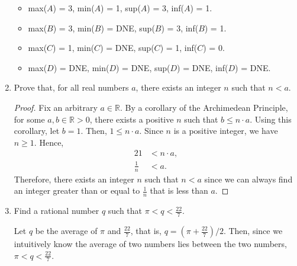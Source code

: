\documentclass{article}
\begin{document}
\begin{enumerate}
                \begin{itemize}
                    \item max($A$) = 3, min($A$) = 1, sup($A$) = 3, inf($A$) = 1.
                    \item max($B$) = 3, min($B$) = DNE, sup($B$) = 3, inf($B$) = 1.
                    \item max($C$) = 1, min($C$) = DNE, sup($C$) = 1, inf($C$) = 0.
                    \item max($D$) = DNE, min($D$) = DNE, sup($D$) = DNE, inf($D$) = DNE. 
                \end{itemize}

    	\item Prove that, for all real numbers $a$, there exists an integer $n$ such that $n < a$. \par
                \begin{proof}
                    Fix an arbitrary $a \in \mathbb{R}$. By a corollary of the Archimedean Principle, for some $a, b \in \mathbb{R} > 0$, there exists a positive $n$ such that $b \le n\cdot a$. Using this corollary, let $b = 1$. Then, $1 \le n \cdot a$. Since $n$ is a positive integer, we have $n \ge 1$. Hence,
                    \begin{alignat*}{2}
                        1 &< n \cdot a, \\
                        \frac{1}{n} &< a.
                    \end{alignat*}
                    Therefore, there exists an integer $n$ such that $n < a$ since we can always find an integer greater than or equal to $\frac{1}{n}$ that is less than $a$. 
                \end{proof}
                
    	\item Find a rational number $q$ such that $\pi < q < \frac{22}{7}$. \par\quad
                Let $q$ be the average of $\pi$ and $\frac{22}{7}$, that is, $q = (\pi + \frac{22}{7}) / 2$. Then, since we intuitively know the average of two numbers lies between the two numbers, $\pi < q < \frac{22}{7}$.\par\quad
                

\end{enumerate}
\end{document}
